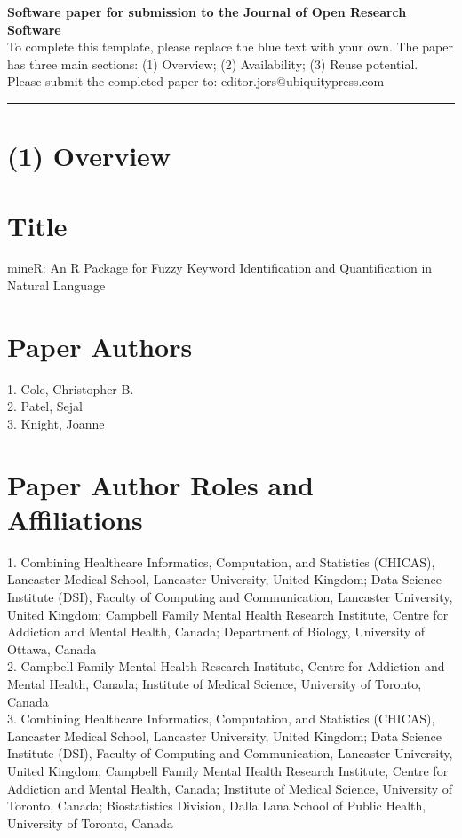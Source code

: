 \documentclass{jors}
\begin{document}
{\bf Software paper for submission to the Journal of Open Research Software} \\

To complete this template, please replace the blue text with your own. The paper has three main sections: (1) Overview; (2) Availability; (3) Reuse potential. \\

Please submit the completed paper to: editor.jors@ubiquitypress.com

\rule{\textwidth}{1pt}

\section*{(1) Overview}

\vspace{0.5cm}

\section*{Title}

mineR: An R Package for Fuzzy Keyword Identification and Quantification in Natural Language

\section*{Paper Authors}

1. Cole, Christopher B.\\
2. Patel, Sejal \\
3. Knight, Joanne

\section*{Paper Author Roles and Affiliations}
1. Combining Healthcare Informatics, Computation, and Statistics (CHICAS), Lancaster Medical School, Lancaster University, United Kingdom; Data Science Institute (DSI), Faculty of Computing and Communication, Lancaster University, United Kingdom; Campbell Family Mental Health Research Institute, Centre for Addiction and Mental Health, Canada; Department of Biology, University of Ottawa, Canada  \\
2. Campbell Family Mental Health Research Institute, Centre for Addiction and Mental Health, Canada; Institute of Medical Science, University of Toronto, Canada \\
3. Combining Healthcare Informatics, Computation, and Statistics (CHICAS), Lancaster Medical School, Lancaster University, United Kingdom; Data Science Institute (DSI), Faculty of Computing and Communication, Lancaster University, United Kingdom; Campbell Family Mental Health Research Institute, Centre for Addiction and Mental Health, Canada; Institute of Medical Science, University of Toronto, Canada; Biostatistics Division, Dalla Lana School of Public Health, University of Toronto, Canada
\end{document}
